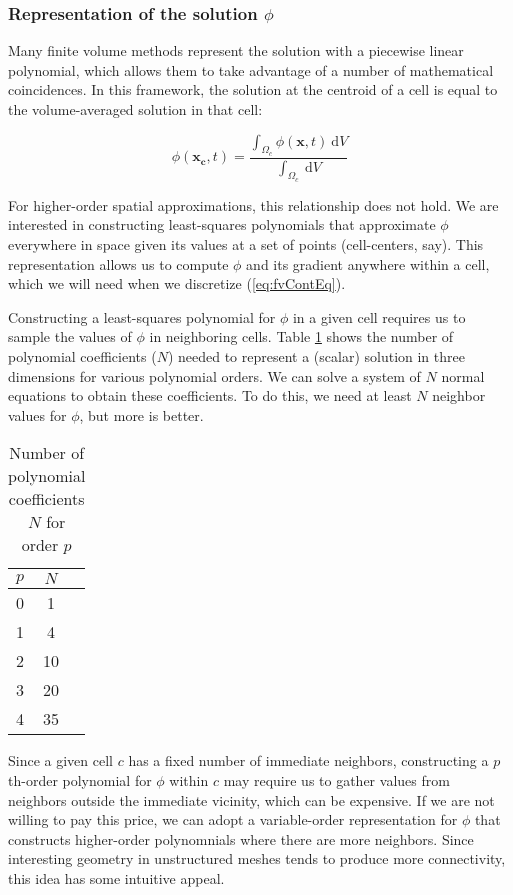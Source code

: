 \documentclass[12pt]{article}
\newcommand{\labelTab}[1]{\label{tab:#1}}
\newcommand{\refEq}[1]{(\ref{eq:#1})}
\newcommand{\refTab}[1]{Table \ref{tab:#1}}
\renewcommand{\vec}[1]{\mathbf{#1}}
\newcommand{\dV}{~\mathrm{d}V}
\begin{document}
\subsubsection*{Representation of the solution $\phi$}

Many finite volume methods represent the solution with a piecewise linear polynomial,
which allows them to take advantage of a number of mathematical coincidences. In this 
framework, the solution at the centroid of a cell is equal to the volume-averaged solution
in that cell:

\begin{equation}
\phi(\vec{x_c}, t) = \frac{\int_{\Omega_c} \phi(\vec{x}, t) \dV}{\int_{\Omega_c}\dV}
\end{equation}

\noindent
For higher-order spatial approximations, this relationship does not hold. We 
are interested in constructing least-squares polynomials that approximate $\phi$ 
everywhere in space given its values at a set of points (cell-centers, say). 
This representation allows us to compute $\phi$ and its gradient anywhere within a
cell, which we will need when we discretize \refEq{fvContEq}. 

Constructing a least-squares polynomial for $\phi$ in a given cell requires us to sample 
the values of $\phi$ in neighboring cells. \refTab{polyCoeffsVsOrder} shows the number of polynomial coefficients ($N$)
needed to represent a (scalar) solution in three dimensions for various polynomial orders. 
We can solve a system of $N$ normal equations to obtain these coefficients. To do this, we need at 
least $N$ neighbor values for $\phi$, but more is better. 

\begin{table}
 \centering
 \begin{tabular}{| l | c | r |} 
 \hline
 $p$ & $N$ \\
 \hline
 0 & 1 \\
 1 & 4 \\
 2 & 10 \\
 3 & 20 \\
 4 & 35 \\
 \hline
 \end{tabular}
 \caption{Number of polynomial coefficients $N$ for order $p$}
 \labelTab{polyCoeffsVsOrder}
\end{table}

Since a given cell $c$ has a fixed number of immediate neighbors, constructing a $p$th-order polynomial for $\phi$ within $c$ 
may require us to gather values from neighbors outside the immediate vicinity, which can be expensive. If we are not willing 
to pay this price, we can adopt a variable-order representation for $\phi$ that constructs higher-order polynomnials where 
there are more neighbors. Since interesting geometry in unstructured meshes tends to produce more connectivity, this idea 
has some intuitive appeal.
\end{document}
